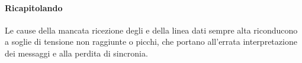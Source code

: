 \paragraph{Ricapitolando}
Le cause della mancata ricezione degli \Ack{}
e della linea dati sempre alta
riconducono a soglie di tensione non raggiunte o picchi,
che portano all'errata interpretazione dei messaggi
e alla perdita di sincronia.








